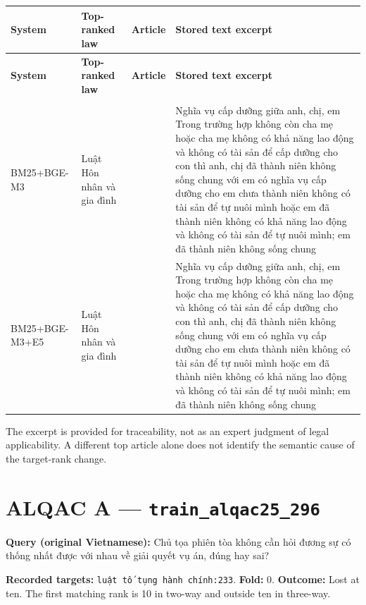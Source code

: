 \begingroup
\scriptsize
\setlength{\tabcolsep}{2pt}
\renewcommand{\arraystretch}{1.0}
\begin{longtable}{>{\raggedright\arraybackslash}p{1.935cm}>{\raggedright\arraybackslash}p{2.585cm}>{\raggedright\arraybackslash}p{1.810cm}>{\raggedright\arraybackslash}p{8.790cm}}
\toprule
\textbf{System} & \textbf{Top-ranked law} & \textbf{Article} & \textbf{Stored text excerpt} \\
\midrule
\endfirsthead
\toprule
\textbf{System} & \textbf{Top-ranked law} & \textbf{Article} & \textbf{Stored text excerpt} \\
\midrule
\endhead
\midrule
\multicolumn{4}{r}{\footnotesize Continued on next page}\\
\endfoot
\bottomrule
\endlastfoot
BM25+\allowbreak{}BGE-M3 & Luật Hôn nhân và gia đình & 112 & Nghĩa vụ cấp dưỡng giữa anh, chị, em Trong trường hợp không còn cha mẹ hoặc cha mẹ không có khả năng lao động và không có tài sản để cấp dưỡng cho con thì anh, chị đã thành niên không sống chung với em có nghĩa vụ cấp dưỡng cho em chưa thành niên không có tài sản để tự nuôi mình hoặc em đã thành niên không có khả năng lao động và không có tài sản để tự nuôi mình; em đã thành niên không sống chung \\
BM25+\allowbreak{}BGE-M3+\allowbreak{}E5 & Luật Hôn nhân và gia đình & 112 & Nghĩa vụ cấp dưỡng giữa anh, chị, em Trong trường hợp không còn cha mẹ hoặc cha mẹ không có khả năng lao động và không có tài sản để cấp dưỡng cho con thì anh, chị đã thành niên không sống chung với em có nghĩa vụ cấp dưỡng cho em chưa thành niên không có tài sản để tự nuôi mình hoặc em đã thành niên không có khả năng lao động và không có tài sản để tự nuôi mình; em đã thành niên không sống chung \\
\end{longtable}
\endgroup

The excerpt is provided for traceability, not as an expert judgment of legal applicability. A different top article alone does not identify the semantic cause of the target-rank change.

\section{ALQAC A — \texttt{train\_al\allowbreak{}qac25\_29\allowbreak{}6}}

\textbf{Query (original Vietnamese):} Chủ tọa phiên tòa không cần hỏi đương sự có thống nhất được với nhau về giải quyết vụ án, đúng hay sai?

\textbf{Recorded targets:} \texttt{luật tố \allowbreak{}tụng hàn\allowbreak{}h chính:\allowbreak{}233}. \textbf{Fold:} 0. \textbf{Outcome:} Lost at ten. The first matching rank is 10 in two-way and outside ten in three-way.

